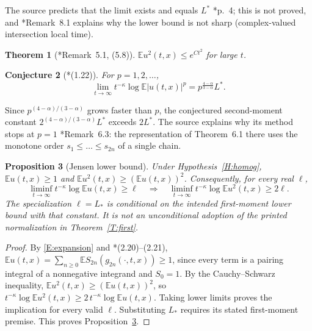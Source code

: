 \documentclass[12pt]{article}
\numberwithin{equation}{section}
\newtheorem{theorem}{Theorem}[section]
\newtheorem{proposition}[theorem]{Proposition}
\newtheorem{conjecture}[theorem]{Conjecture}
\theoremstyle{definition}
\newcommand{\E}{\mathbb{E}}
\begin{document}
The source predicts that the limit exists and equals $L^*$
\cite{chen:author2026:time-dependency}*{p.~4}; this is not proved, and
\cite{chen:author2026:time-dependency}*{Remark~8.1} explains why the lower
bound is not sharp (complex-valued intersection local time).

\begin{theorem}[\cite{chen:author2026:time-dependency}*{Remark~5.1, (5.8)}]\label{T:crude}
  $\E u^2(t,x)\le e^{Ct^2}$ for large $t$.
\end{theorem}

\begin{conjecture}[\cite{chen:author2026:time-dependency}*{(1.22)}]\label{Conj:allp}
  For $p=1,2,\dots$,
  \[
    \lim_{t\to\infty}t^{-\kappa}\log\E|u(t,x)|^p
    =p^{\frac{4-\alpha}{3-\alpha}}L^*.
  \]
\end{conjecture}

Since $p^{(4-\alpha)/(3-\alpha)}$ grows faster than $p$, the conjectured
second-moment constant $2^{(4-\alpha)/(3-\alpha)}L^*$ exceeds $2L^*$.
The source explains why its method stops at $p=1$
\cite{chen:author2026:time-dependency}*{Remark~6.3}: the representation of
Theorem~6.1 there uses the monotone order $s_1\le\dots\le s_{2n}$ of a single
chain.

\begin{proposition}[Jensen lower bound]\label{P:Jensen}
  Under Hypothesis~\ref{H:homog}, $\E u(t,x)\ge1$ and
  $\E u^2(t,x)\ge(\E u(t,x))^2$. Consequently, for every real $\ell$,
  \[
    \liminf_{t\to\infty}t^{-\kappa}\log\E u(t,x)\ge\ell
    \quad\Longrightarrow\quad
    \liminf_{t\to\infty}t^{-\kappa}\log\E u^2(t,x)\ge2\ell.
  \]
  The specialization $\ell=L_*$ is conditional on the intended
  first-moment lower bound with that constant. It is not an unconditional
  adoption of the printed normalization in Theorem~\ref{T:first}.
\end{proposition}

\begin{proof}
  By \eqref{E:expansion} and \cite{chen:author2026:time-dependency}*{(2.20)--(2.21)},
  $\E u(t,x)=\sum_{n\ge0}\E S_{2n}(g_{2n}(\cdot,t,x))\ge1$, since every term is
  a pairing integral of a nonnegative integrand and $S_0=1$. By the
  Cauchy--Schwarz inequality, $\E u^2(t,x)\ge(\E u(t,x))^2$, so
  $t^{-\kappa}\log\E u^2(t,x)\ge2\,t^{-\kappa}\log\E u(t,x)$.
  Taking lower limits proves the implication for every valid $\ell$.
  Substituting $L_*$ requires its stated first-moment premise.
  This proves Proposition~\ref{P:Jensen}.
\end{proof}
\end{document}
